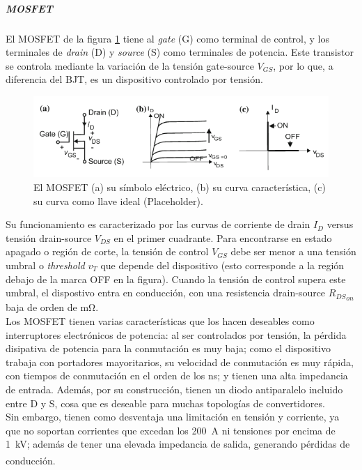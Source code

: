 \subparagraph{MOSFET}

El MOSFET de la figura \ref{mosfet} tiene al \textit{gate} (G) como terminal de control, y los terminales de \textit{drain} (D) y \textit{source} (S) como terminales de potencia. Este transistor se controla mediante la variación de la tensión gate-source $V_{GS}$, por lo que, a diferencia del BJT, es un dispositivo controlado por tensión.\\

\begin{figure}[h]
    \centering
    \includegraphics[scale=0.6]{Imagenes/MOSFET.png}
    \caption{El MOSFET (a) su símbolo eléctrico, (b) su curva característica, (c) su curva como llave ideal (Placeholder).}
    \label{mosfet}
\end{figure}

Su funcionamiento es caracterizado por las curvas de corriente de drain $I_D$ versus tensión drain-source $V_{DS}$ en el primer cuadrante. Para encontrarse en estado apagado o región de corte, la tensión de control $V_{GS}$ debe ser menor a una tensión umbral o \textit{threshold} $v_T$ que depende del dispositivo (esto corresponde a la región debajo de la marca OFF en la figura). Cuando la tensión de control supera este umbral, el dispostivo entra en conducción, con una resistencia drain-source ${R_{DS}}_{on}$ baja de orden de \unit[]{\milli\ohm}.\\

Los MOSFET tienen varias características que los hacen deseables como interruptores electrónicos de potencia: al ser controlados por tensión, la pérdida disipativa de potencia para la conmutación es muy baja; como el dispositivo trabaja con portadores mayoritarios, su velocidad de conmutación es muy rápida, con tiempos de conmutación en el orden de los \unit[]{\nano\second}; y tienen una alta impedancia de entrada. Además, por su construcción, tienen un diodo antiparalelo incluido entre D y S, cosa que es deseable para muchas topologías de convertidores.\\

Sin embargo, tienen como desventaja una limitación en tensión y corriente, ya que no soportan corrientes que excedan los \SI[]{200}[]{\ampere} ni tensiones por encima de \SI[]{1}[]{\kilo\volt}; además de tener una elevada impedancia de salida, generando pérdidas de conducción.\textsuperscript{\cite{PotenciaHart}\cite{PowerElecRenewableEnergySystems}}\\

